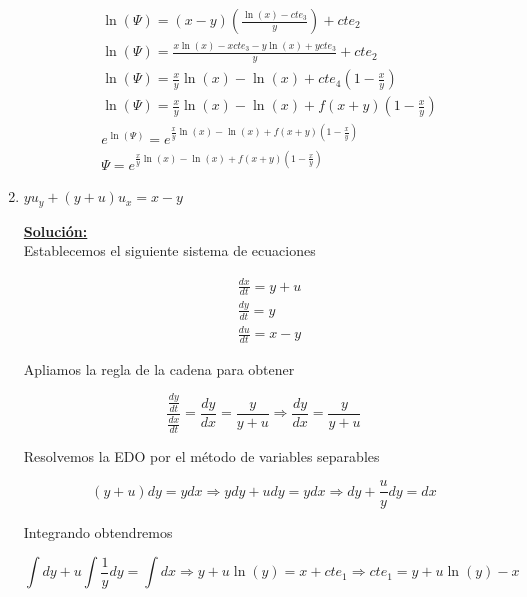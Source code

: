 \documentclass{article}
\begin{document}
\begin{enumerate}
						\begin{align*}
							&\ln (\Psi)=(x-y)\left( \frac{\ln (x)-cte_3}{y} \right)+cte_2\\
							&\ln (\Psi)= \frac{x\ln (x)-xcte_3-y\ln(x)+ycte_3}{y} +cte_2\\
							&\ln (\Psi)=\frac{x}{y}\ln (x)-\ln (x)+cte_4\left(1-\frac{x}{y}									\right)\\
							&\ln (\Psi)=\frac{x}{y}\ln (x)-\ln (x)+f(x+y)\left(1-\frac{x}{y}									\right)\\ 
							&e^{\ln (\Psi)} = e^{\frac{x}{y}\ln (x)-\ln (x)+f(x+y)\left(1-									\frac{x}{y}\right)}\\
							&\Psi=e^{\frac{x}{y}\ln (x)-\ln (x)+f(x+y)\left(1-\frac{x}{y}									\right)}
						\end{align*}		
					
					
			\item $yu_y +(y+u)u_x=x-y$
				
				{\bf\underline{Solución:}}\\
				
					
					Establecemos el siguiente sistema de ecuaciones
						
						\begin{align}
							&\frac{dx}{dt}=y+u\\
							&\frac{dy}{dt}=y\\
							&\frac{du}{dt}=x-y
						\end{align}
					
					Apliamos la regla de la cadena para obtener
						
						\begin{equation*}
							\frac{\frac{dy}{dt}}{\frac{dx}{dt}} = \frac{dy}{dx} = \frac{y}{y+u} \Longrightarrow \frac{dy}{dx}=\frac{y}{y+u}
						\end{equation*}
					
					Resolvemos la EDO por el método de variables separables
						
						\begin{equation*}
							(y+u)dy=ydx \Longrightarrow ydy+udy=ydx \Longrightarrow dy+\frac{u}{y} dy = dx
						\end{equation*}
					
					Integrando obtendremos
						
						\begin{equation}
							\int dy + u \int \frac{1}{y} dy=\int dx \Longrightarrow y+u\ln (y) =x+ cte_1 \Longrightarrow cte_1=y+u\ln (									y)-x
						\end{equation}
					

\end{enumerate}
\end{document}
